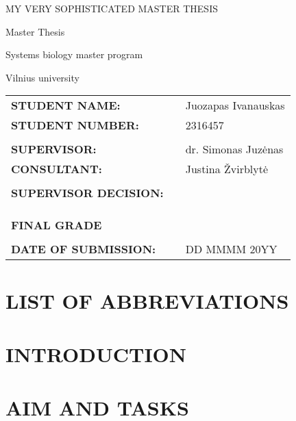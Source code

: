 \documentclass[11pt]{report}
\begin{document}
\begin{titlepage}
  \centering
  \vspace*{3cm}
  {\fontsize{16pt}{24pt}\selectfont MY VERY SOPHISTICATED MASTER THESIS\par}
  {\fontsize{12pt}{24pt}\selectfont Master Thesis\par}
  {\fontsize{12pt}{24pt}\selectfont Systems biology master program\par}
  {\fontsize{12pt}{24pt}\selectfont Vilnius university\par}
  \vspace*{5cm}
  \begin{tabular}{@{}lll@{}}
    \textbf{STUDENT NAME:} & \hspace{3cm} & Juozapas Ivanauskas \\
    \textbf{STUDENT NUMBER:} & & 2316457 \\
    \\
    \textbf{SUPERVISOR:} & & dr. Simonas Juzėnas \\
    \textbf{CONSULTANT:} & & Justina Žvirblytė \\
    \\
    \textbf{SUPERVISOR DECISION:} & & \dotfill \\
    \\
    \\
    \\
    \textbf{FINAL GRADE} & & \dotfill \\
    \\
    \textbf{DATE OF SUBMISSION:} & & DD MMMM 20YY \\
  \end{tabular}

\end{titlepage}

\tableofcontents

\chapter{LIST OF ABBREVIATIONS}


\chapter{INTRODUCTION}

\chapter{AIM AND TASKS}
\end{document}
